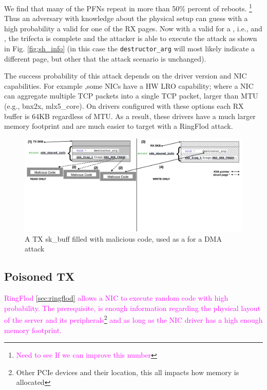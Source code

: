 We find that many of the PFNs repeat in more than 50\% percent of reboots. \footnote{\textcolor{magenta}{Need to see If we can improve this number}} Thus an adversary with knowledge about the physical setup can guess with a high probability a valid \kva{} for one of the RX pages. Now with a valid \kva{} for a \mabaf{},  i.e., \means{} and \motivation{}, the trifecta is complete and the attacker is able to execute the attack as shown in Fig. \ref{fig:sh_info} (in this case the \texttt{destructor\_arg} will most likely indicate a different page, but other that the attack scenario is unchanged).

The success probability of this attack depends on the driver version and NIC capabilities. For example ,some NICs have a HW LRO capability; where a NIC can aggregate multiple TCP packets into a single TCP packet, larger than MTU \cite{mlx5_lro}(e.g., bnx2x, mlx5\_core). On drivers configured with these options each RX buffer is 64KB regardless of MTU. As a result, these drivers have a much larger memory footprint\cite{MSMT18} and are much easier to target with a RingFlod attack.

\begin{figure}[t]
    \centering
    \includegraphics[width=\linewidth]{figs/accomplice.pdf}
    \caption{A TX sk\_buff filled with malicious code, used as a \means for a DMA attack}
    \label{fig:payload}
\end{figure}
\subsection{Poisoned TX}\label{sec:posion}

\textcolor{magenta}{RingFlod \ref{sec:ringflod} allows a NIC to execute random code with high probability. The prerequisite, is enough information regarding the physical layout of the server and its peripherals\footnote{Other PCIe devices and their location, this all impacts how memory is allocated} and as long as the NIC driver has a high enough memory footprint. }

